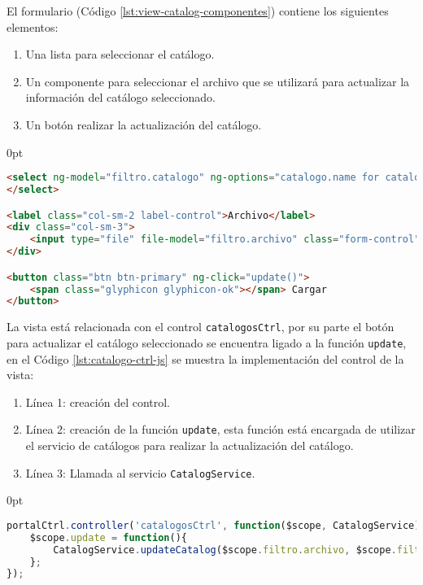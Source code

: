 \begin{enumerate}
\pagebreak

El formulario (Código \ref{lst:view-catalog-componentes}) contiene los siguientes elementos:
\begin{enumerate}
	\item Una lista para seleccionar el catálogo.
	\item Un componente para seleccionar el archivo que se utilizará para actualizar la información del catálogo seleccionado.
	\item Un botón realizar la actualización del catálogo.
\end{enumerate}
\begin{adjustwidth}{\listingfixwidth}{0pt}
\begin{lstlisting}[language=HTML, captionpos=b, caption={Elementos del formulario para seleccionar catálogo.}, label={lst:view-catalog-componentes}]
<select ng-model="filtro.catalogo" ng-options="catalogo.name for catalogo in catalogos" class="form-control">
</select>

<label class="col-sm-2 label-control">Archivo</label>
<div class="col-sm-3">
	<input type="file" file-model="filtro.archivo" class="form-control"/>
</div>

<button class="btn btn-primary" ng-click="update()">
	<span class="glyphicon glyphicon-ok"></span> Cargar
</button>
\end{lstlisting}
\end{adjustwidth}

La vista está relacionada con el control \texttt{catalogosCtrl}, por su parte el botón para actualizar el catálogo seleccionado se encuentra ligado a la función \texttt{update}, en el Código \ref{lst:catalogo-ctrl-js} se muestra la implementación del control de la vista:

\begin{enumerate}
	\item Línea 1: creación del control. 
	\item Línea 2: creación de la función \texttt{update}, esta función está encargada de utilizar el servicio de catálogos para realizar la actualización del catálogo.
	\item Línea 3: Llamada al servicio \texttt{CatalogService}.
\end{enumerate}

\pagebreak
\begin{adjustwidth}{\listingfixwidth}{0pt}
\begin{lstlisting}[language=Javascript, caption={Controlador de la vista Catálogo.}, captionpos=b, label={lst:catalogo-ctrl-js}]
portalCtrl.controller('catalogosCtrl', function($scope, CatalogService){
	$scope.update = function(){
		CatalogService.updateCatalog($scope.filtro.archivo, $scope.filtro.catalogo.name);
	};
});
\end{lstlisting}
\end{adjustwidth}


\end{enumerate}
